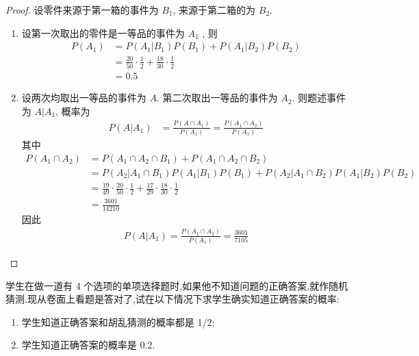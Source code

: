 \documentclass[../main.tex]{subfiles}
\begin{document}
\begin{proof}
    设零件来源于第一箱的事件为 \(  B_1  \), 来源于第二箱的为 \(  B_2  \).  \begin{enumerate}
        \item 设第一次取出的零件是一等品的事件为 \(  A_1  \) , 则 \[
        \begin{aligned}
        P\left( A_1 \right)&= P\left( A_1|B_1 \right)P\left( B_1 \right)+ P\left( A_1|B_2 \right)P\left( B_2 \right)\\ 
         &= \frac{20 }{50 }\cdot \frac{1 }{2 }+ \frac{18 }{30 }\cdot \frac{1 }{2 }\\ 
          &= 0.5          
        \end{aligned}
        \]
        \item 设两次均取出一等品的事件为 \(  A  \). 第二次取出一等品的事件为 \(  A_2  \). 则题述事件为 \(  A|A_1  \), 概率为 \[
    \begin{aligned}
      P\left( A|A_1 \right)&= \frac{P\left( A\cap A_1 \right)  }{P\left( A_1 \right)  }= \frac{P\left( A_1\cap A_2 \right)  }{P\left( A_1 \right)  }            
    \end{aligned} 
        \]  其中 \[
       \begin{aligned}
        P\left( A_1\cap A_2 \right) &=P\left( A_1\cap A_2\cap B_1 \right)+ P\left( A_1\cap A_2\cap B_2 \right)\\ 
         &= P\left( A_2|A_1\cap B_1 \right)P\left(A_1| B_1 \right)P\left( B_1 \right) + P\left( A_2|A_1\cap B_2 \right)      P\left( A_1|B_2 \right) P\left( B_2 \right)\\ 
          &= \frac{19 }{49 }\cdot \frac{20 }{50 } \cdot \frac{1 }{2 }+ \frac{17 }{29 }\cdot \frac{18 }{30 } \cdot \frac{1 }{2 }     \\ 
           &= \frac{3601 }{14210 } 
       \end{aligned}
        \] 因此 \[
        \begin{aligned}
       P\left( A|A_1 \right)= \frac{P\left( A_1\cap A_2 \right)  }{P\left( A_1 \right)  }= \frac{3601 }{7105 }   
        \end{aligned}   
        \]
    \end{enumerate}
    
\end{proof}
\begin{exercise}{}{}
学生在做一道有 4 个选项的单项选择题时,如果他不知道问题的正确答案,就作随机猜测.现从卷面上看题是答对了,试在以下情况下求学生确实知道正确答案的概率:
\begin{enumerate}
    \item 学生知道正确答案和胡乱猜测的概率都是 1/2;
    \item 学生知道正确答案的概率是 0.2.
\end{enumerate}
\end{exercise}
\end{document}
